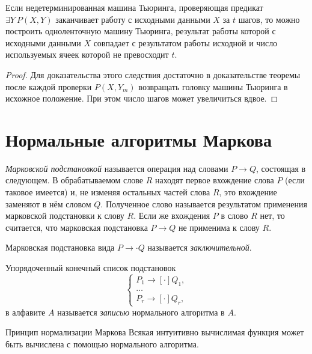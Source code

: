 \begin{implication}[из доказательства]
	Если недетерминированная машина Тьюринга, проверяющая предикат $ \exists Y~P(X, Y) $ заканчивает работу с исходными данными $ X $ за $ t $ шагов, то можно построить одноленточную машину Тьюринга, результат работы которой с исходными данными $ X $ совпадает с результатом работы исходной и число используемых ячеек которой не превосходит $ t $.
\end{implication}

\begin{proof}
	Для доказательства этого следствия достаточно в доказательстве теоремы после каждой проверки $ P(X, Y_m) $ возвращать головку машины Тьюринга в исхожное положение.
	При этом число шагов может увеличиться вдвое.
\end{proof}

\section{Нормальные алгоритмы Маркова}

\begin{definition}
	\emph{Марковской подстановкой} называется операция над словами $ P \to Q $, состоящая в следующем.
	В обрабатываемом слове $ R $ находят первое вхождение слова $ P $ (если таковое имеется) и, не изменяя остальных частей слова $ R $, это вхождение заменяют в нём словом $ Q $.
	Полученное слово называется результатом применения марковской подстановки к слову $ R $.
	Если же вхождения $ P $ в слово $ R $ нет, то считается, что марковская подстановка $ P \to Q $ не применима к слову $ R $.

	Марковская подстановка вида $ P \to \cdot Q $ называется \emph{заключительной}.
\end{definition}

\begin{definition}
	Упорядоченный конечный список подстановок
	$$
	\begin{cases}
		P_1 \to [\cdot]Q_1, \\
		\dots \\
		P_r \to [\cdot]Q_r,
	\end{cases} $$
	в алфавите $ A $ называется \emph{записью} нормального алгоритма в $ A $.
\end{definition}

\begin{undefthm}{Принцип нормализации Маркова}
	Всякая интуитивно вычислимая функция может быть вычислена с помощью нормального алгоритма.
\end{undefthm}

